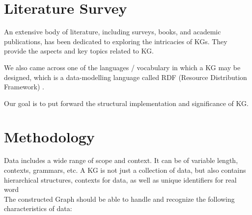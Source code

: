\documentclass[conference]{IEEEtran}
\begin{document}
\section{Literature Survey}
An extensive body of literature, including surveys, books, and academic publications, has been dedicated to exploring the intricacies of KGs. 
They provide the aspects and key topics related to KG.

We also came across one of the languages / vocabulary in which a KG may be designed, which is a data-modelling language called RDF (Resource Distribution Framework) \cite{b1}.

Our goal is to put forward the structural implementation and significance of KG.


\section{Methodology}
Data includes a wide range of scope and context. It can be of variable length, contexts, grammars, etc.
A KG is not just a collection of data, but also contains hierarchical structures, contexts for data, as well as unique identifiers for real word \cite{b8}
\\
The  constructed Graph should be able to handle and recognize the following characteristics of data:
\end{document}
